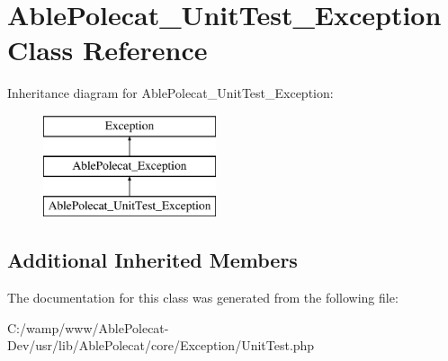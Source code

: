 \hypertarget{class_able_polecat___unit_test___exception}{}\section{Able\+Polecat\+\_\+\+Unit\+Test\+\_\+\+Exception Class Reference}
\label{class_able_polecat___unit_test___exception}
Inheritance diagram for Able\+Polecat\+\_\+\+Unit\+Test\+\_\+\+Exception\+:\begin{figure}[H]
\begin{center}
\leavevmode
\includegraphics[height=3.000000cm]{class_able_polecat___unit_test___exception}
\end{center}
\end{figure}
\subsection*{Additional Inherited Members}


The documentation for this class was generated from the following file\+:\begin{DoxyCompactItemize}
\item 
C\+:/wamp/www/\+Able\+Polecat-\/\+Dev/usr/lib/\+Able\+Polecat/core/\+Exception/Unit\+Test.\+php\end{DoxyCompactItemize}
